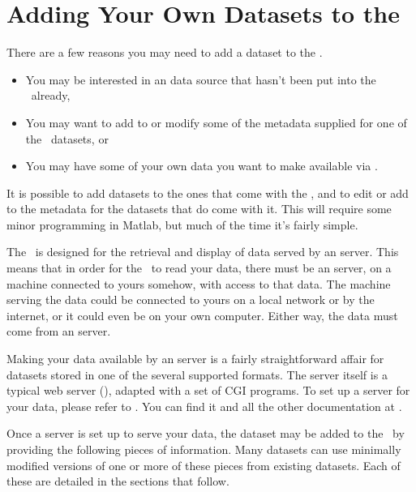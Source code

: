%
%
%

\chapter{Adding Your Own Datasets to the \GUI}
\label{gui,adding}


There are a few reasons you may need to add a dataset to the \GUI.  

\begin{itemize}
\item You may be interested in an \opendap data source that hasn't
  been put into the \GUI\ already, 
\item You may want to add to or modify some of the metadata supplied
  for one of the \GUI\ datasets, or
\item You may have some of your own data you want to make available
  via \opendap.
\end{itemize}


It is possible to add datasets to the ones that come with the \GUI,
and to edit or add to the metadata for the datasets that do come with
it.  This will require some minor programming in Matlab, but much of
the time it's fairly simple.

The \GUI\ is designed for the retrieval and display of data served by
an \opendap server. This means that in order for the \GUI\ to read
your data, there must be an \opendap server, on a machine connected to
yours   somehow, with access to that data.  The machine serving
the data could be connected to yours on a local network or by the
internet, or it could even be on your own computer.  Either way, the
data must come from an \opendap server.

Making your data available by an \opendap server is a fairly
straightforward affair for datasets stored in one of the several
supported formats.  The server itself is a typical web server
(), adapted with a set of \opendap CGI programs. To set up a
server for your data, please refer to \OPDuser .  You can find it and
all the other \opendap documentation at \OPDhome.

Once a \opendap server is set up to serve your data, the dataset may be
added to the \GUI\ by providing the following pieces of information.
Many datasets can use minimally modified versions of one or more of
these pieces from existing datasets. Each of these are detailed in the
sections that follow.



